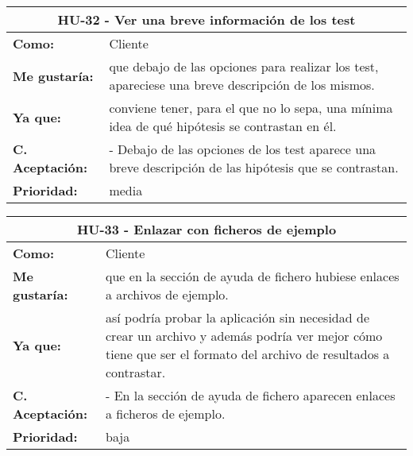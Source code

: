 \begin{table}[H]
	\begin{tabular}{| p{3cm}| p{11cm} |}
		\hline
		\multicolumn{2}{|c|}{\textbf{HU-32} - Ver una breve información de los test} \\ \hline
		\textbf{Como:} & Cliente \\ \hline
		\textbf{Me gustaría:} & que debajo de las opciones para realizar los test, apareciese una breve descripción de los mismos. \\ \hline
		\textbf{Ya que:} & conviene tener, para el que no lo sepa, una mínima idea de qué hipótesis se contrastan en él. \\ \hline
		\textbf{C. Aceptación:} & - Debajo de las opciones de los test aparece una breve descripción de las hipótesis que se contrastan. \\ \hline
		\textbf{\textbf{Prioridad:}} & media \\ \hline
	\end{tabular}
\end{table}


\begin{table}[H]
	\begin{tabular}{| p{3cm}| p{11cm} |}
		\hline
		\multicolumn{2}{|c|}{\textbf{HU-33} - Enlazar con ficheros de ejemplo} \\ \hline
		\textbf{Como:} & Cliente \\ \hline
		\textbf{Me gustaría:} & que en la sección de ayuda de fichero hubiese enlaces a archivos de ejemplo. \\ \hline
		\textbf{Ya que:} & así podría probar la aplicación sin necesidad de crear un archivo y además podría ver mejor cómo tiene que ser el formato del archivo de resultados a contrastar. \\ \hline
		\textbf{C. Aceptación:} & - En la sección de ayuda de fichero aparecen enlaces a ficheros de ejemplo. \\ \hline
		\textbf{\textbf{Prioridad:}} & baja \\ \hline
	\end{tabular}
\end{table}


